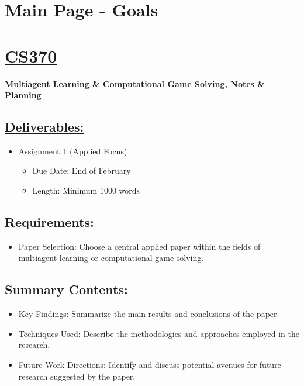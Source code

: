 \documentclass[
]{article}
\author{}
\date{}
\begin{document}
\section*{Main Page - Goals}\label{main-page---goals}

\section*{\texorpdfstring{\textbf{\ul{CS370}}}{CS370}}\label{cs370}

\textbf{\ul{Multiagent Learning \& Computational Game Solving, Notes \&
Planning}}

\subsection*{\texorpdfstring{\textbf{\ul{Deliverables:}}}{Deliverables:}}\label{deliverables}

\begin{itemize}
\item
  Assignment 1 (Applied Focus)

  \begin{itemize}
  \item
    Due Date: End of February
  \item
    Length: Minimum 1000 words
  \end{itemize}
\end{itemize}

\subsection{Requirements:}\label{requirements}

\begin{itemize}
\item
  Paper Selection: Choose a central applied paper within the fields of
  multiagent learning or computational game solving.
\end{itemize}

\subsection{Summary Contents:}\label{summary-contents}

\begin{itemize}
\item
  Key Findings: Summarize the main results and conclusions of the paper.
\item
  Techniques Used: Describe the methodologies and approaches employed in
  the research.
\item
  Future Work Directions: Identify and discuss potential avenues for
  future research suggested by the paper.
\end{itemize}
\end{document}
